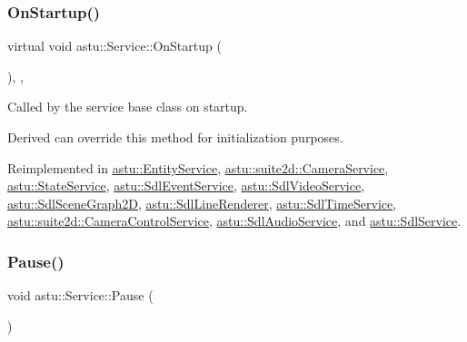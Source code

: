 \mbox{\label{classastu_1_1Service_a357dc663e000b1f086f681ec3c459bfe}} 
\subsubsection{\texorpdfstring{On\+Startup()}{OnStartup()}}
{\footnotesize\ttfamily virtual void astu\+::\+Service\+::\+On\+Startup (\begin{DoxyParamCaption}{ }\end{DoxyParamCaption})\hspace{0.3cm}{\ttfamily [inline]}, {\ttfamily [protected]}, {\ttfamily [virtual]}}

Called by the service base class on startup.

Derived can override this method for initialization purposes. 

Reimplemented in \hyperlink{classastu_1_1EntityService_a293ff7c8b84837b08cdabe98ed8a23ea}{astu\+::\+Entity\+Service}, \hyperlink{classastu_1_1suite2d_1_1CameraService_ac86690e80a0d6805abde747e501460ee}{astu\+::suite2d\+::\+Camera\+Service}, \hyperlink{classastu_1_1StateService_a06419feca958b72db99dde6eda301f86}{astu\+::\+State\+Service}, \hyperlink{classastu_1_1SdlEventService_a71805a124600a23e48158daa5dc57fff}{astu\+::\+Sdl\+Event\+Service}, \hyperlink{classastu_1_1SdlVideoService_add229ac2af59a4aea090e4de4c67e530}{astu\+::\+Sdl\+Video\+Service}, \hyperlink{classastu_1_1SdlSceneGraph2D_a141138f2cbda543b9bcbd0803e0ebd19}{astu\+::\+Sdl\+Scene\+Graph2D}, \hyperlink{classastu_1_1SdlLineRenderer_abe90e838b83f67c5e336d1b95cdea8a0}{astu\+::\+Sdl\+Line\+Renderer}, \hyperlink{classastu_1_1SdlTimeService_ac11551691bb14289020028a2a162c7d6}{astu\+::\+Sdl\+Time\+Service}, \hyperlink{classastu_1_1suite2d_1_1CameraControlService_a7965cdf848813b62aed86ecc8c34fcc8}{astu\+::suite2d\+::\+Camera\+Control\+Service}, \hyperlink{classastu_1_1SdlAudioService_a1138e9e9ab37cbc78e37a6e529561c3b}{astu\+::\+Sdl\+Audio\+Service}, and \hyperlink{classastu_1_1SdlService_a2fcb46537de794ab6e4f5e043b26ff60}{astu\+::\+Sdl\+Service}.

\mbox{\label{classastu_1_1Service_a818001c0eea6dbde944c2aa28c206c99}} 
\subsubsection{\texorpdfstring{Pause()}{Pause()}}
{\footnotesize\ttfamily void astu\+::\+Service\+::\+Pause (\begin{DoxyParamCaption}{ }\end{DoxyParamCaption})}

